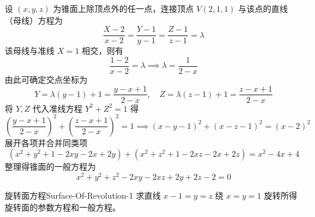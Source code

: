 \begin{solution}
    设 $(x, y, z)$ 为锥面上除顶点外的任一点，连接顶点 $V(2, 1, 1)$ 与该点的直线（母线）方程为
    \begin{equation}
        \frac{X - 2}{x - 2} = \frac{Y - 1}{y - 1} = \frac{Z - 1}{z - 1} = \lambda
    \end{equation}
    该母线与准线 $X = 1$ 相交，则有
    \begin{equation}
        \frac{1 - 2}{x - 2} = \lambda \implies \lambda = \frac{1}{2 - x}
    \end{equation}
    由此可确定交点坐标为
    \begin{equation}
        Y = \lambda(y - 1) + 1 = \frac{y - x + 1}{2 - x}, \quad Z = \lambda(z - 1) + 1 = \frac{z - x + 1}{2 - x}
    \end{equation}
    将 $Y, Z$ 代入准线方程 $Y^2 + Z^2 = 1$ 得
    \begin{equation}
        \left(\frac{y - x + 1}{2 - x}\right)^2 + \left(\frac{z - x + 1}{2 - x}\right)^2 = 1 \implies (x - y - 1)^2 + (x - z - 1)^2 = (x - 2)^2
    \end{equation}
    展开各项并合并同类项
    \begin{equation}
        (x^2 + y^2 + 1 - 2xy - 2x + 2y) + (x^2 + z^2 + 1 - 2xz - 2x + 2z) = x^2 - 4x + 4
    \end{equation}
    整理得锥面的一般方程为
    \begin{equation}
        \boxed{x^2 + y^2 + z^2 - 2xy - 2xz + 2y + 2z - 2 = 0}
    \end{equation}
\end{solution}


\begin{problem}{旋转面方程}{Surface-Of-Revolution-1}
    求直线 $x - 1 = y = z$ 绕 $x = y = 1$ 旋转所得旋转面的参数方程和一般方程。
\end{problem}

